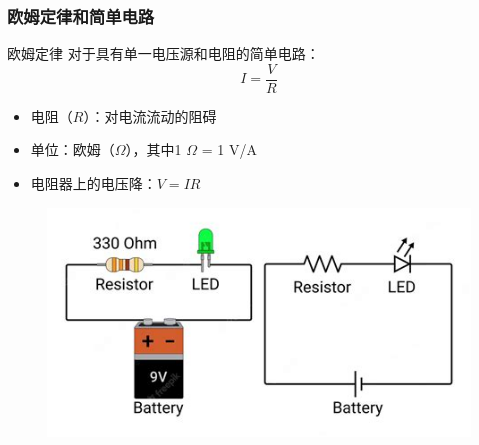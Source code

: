 \documentclass{beamer}
\begin{document}
\begin{frame}
    \frametitle{欧姆定律和简单电路}
    \begin{block}{欧姆定律}
        对于具有单一电压源和电阻的简单电路：
        \[ I = \frac{V}{R} \]
    \end{block}
    \begin{itemize}
        \item 电阻（$R$）：对电流流动的阻碍
        \item 单位：欧姆（$\Omega$），其中1 $\Omega$ = 1 V/A
        \item 电阻器上的电压降：$V = IR$
    \end{itemize}
    \begin{center}
        \begin{figure}
            \centering
            \includegraphics[width=0.5\linewidth]{phys12-gravity-newtons-law-of-universal-gravitation-formula.jpg}
        \end{figure}
    \end{center}
\end{frame}
\end{document}
